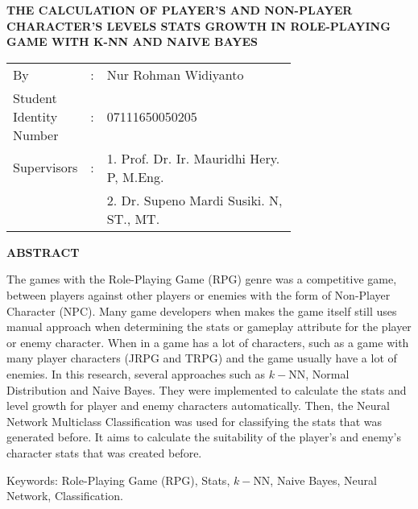 \begin{spacing}{1}
	\begin{center}
		\large\textbf{THE CALCULATION OF PLAYER'S AND NON-PLAYER CHARACTER'S LEVELS STATS GROWTH IN ROLE-PLAYING GAME WITH K-NN AND NAIVE BAYES}
	\end{center}
	\vspace{2ex}
	
	\begin{adjustwidth}{-0.2cm}{}
		\begin{tabular}{lcp{0.7\linewidth}}
			By &:& Nur Rohman Widiyanto \\
			Student Identity Number &:&	07111650050205 \\
			Supervisors &:& 1. Prof. Dr. Ir. Mauridhi Hery. P, M.Eng. \\
			& & 2. Dr. Supeno Mardi Susiki. N, ST., MT. \\
		\end{tabular}
	\end{adjustwidth}
	\vspace{2ex}
	
	\begin{center}
		\large\textbf{ABSTRACT}
	\end{center}
	\vspace{1ex}
	
	The games with the Role-Playing Game (RPG) genre was a competitive game, between players against other players or enemies with the form of Non-Player Character (NPC). Many game developers when makes the game itself still uses manual approach when determining the stats or gameplay attribute for the player or enemy character. When in a game has a lot of characters, such as a game with many player characters (JRPG and TRPG) and the game usually have a lot of enemies. In this research, several approaches such as $k-$NN, Normal Distribution and Naive Bayes. They were implemented to calculate the stats and level growth for player and enemy characters automatically. Then, the Neural Network Multiclass Classification was used for classifying the stats that was generated before. It aims to calculate the suitability of the player's and enemy's character stats that was created before.
	\vspace{2ex}

	Keywords: Role-Playing Game (RPG), Stats, $k-$NN, Naive Bayes, Neural Network, Classification.
\end{spacing}